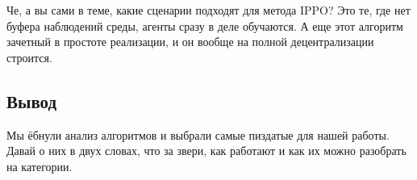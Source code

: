 Че, а вы сами в теме, какие сценарии подходят для метода IPPO? Это те, где нет буфера наблюдений среды, агенты сразу в деле обучаются. А еще этот алгоритм зачетный в простоте реализации, и он вообще на полной децентрализации строится.

\subsection*{Вывод}

Мы ёбнули анализ алгоритмов и выбрали самые пиздатые для нашей работы. Давай о них в двух словах, что за звери, как работают и как их можно разобрать на категории.